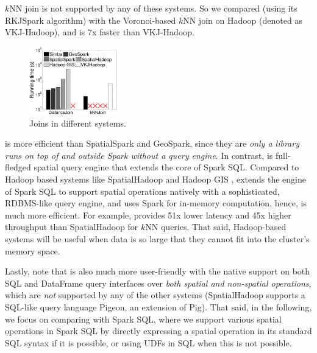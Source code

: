 $k$NN join is not supported by any of these systems. So we compared \name
(using its RKJSpark algorithm) with the Voronoi-based $k$NN join on Hadoop
\cite{vhadoop} (denoted as VKJ-Hadoop), and \name is 7x faster than VKJ-Hadoop.



\begin{figure}
 \centering
 \vspace*{-0.2cm}
  \hspace*{-0.3cm}
  \includegraphics[width=1.5in]{figs/exp/osm_join_time}
  \vspace*{-0.80cm}
  \caption{\label{fig:system_join}Joins in different systems.}\vspace{-2mm}
\end{figure}
\name is more efficient than SpatialSpark \cite{spatialspark} and
GeoSpark\cite{geospark}, since they are {\em only a library runs on
top of and outside Spark without a query engine}. In contrast, \name
is full-fledged spatial query engine that extends the core of Spark SQL.
Compared to Hadoop based systems like SpatialHadoop \cite{spatialhadoop}
and Hadoop GIS \cite{hadoopgis}, \name extends the engine of Spark SQL
to support spatial operations natively with a sophisticated, RDBMS-like
query engine, and uses Spark for in-memory computation, hence, is much
more efficient. For example, \name provides 51x lower latency and 45x
higher throughput than SpatialHadoop for $k$NN queries. That said,
Hadoop-based systems will be useful when data is so large that they
cannot fit into the cluster's memory space.

Lastly, note that \name is also much more user-friendly with the
native support on both SQL and DataFrame query interfaces over {\em
both spatial and non-spatial operations}, which are {\em not}
supported by any of the other systems (SpatialHadoop supports a
SQL-like query language Pigeon, an extension of Pig). That said, in
the following, we focus on comparing \name with Spark SQL, where we
support various spatial operations in Spark SQL by directly expressing
a spatial operation in its standard SQL syntax if it is possible, or
using UDFs in SQL when this is not possible.

